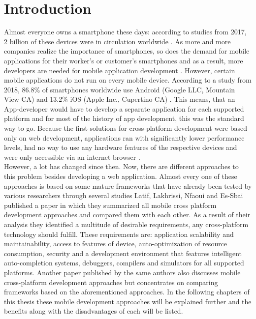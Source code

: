 \documentclass[Bachelor,BIF,english]{twbook}
\begin{document}
\chapter{Introduction}
Almost everyone owns a smartphone these days: according to studies from 2017, 2 billion of these devices were in circulation worldwide \cite[p.~184]{MartinezLecomte2017}. As more and more companies realize the importance of smartphones, so does the demand for mobile applications for their worker's or customer’s smartphones and as a result, more developers are needed for mobile application development \cite{Danielsson_2016} \cite{GaouarBenamarBendimerad2016}.
However, certain mobile applications do not run on every mobile device. According to a study \cite{OSMarketShare} from 2018, 86.8\% of smartphones worldwide use Android (Google LLC, Mountain View CA) and 13.2\% iOS (Apple Inc., Cupertino CA) \cite[p.~5]{Steczko2016}. This means, that an App-developer  would have to develop a separate application for each supported platform and for most of the history of app development, this was the standard way to go. Because the first solutions for cross-platform development were based only on web development, applications ran with significantly lower performance levels, had no way to use any hardware features of the respective devices and were only accessible via an internet browser \cite[p.~626]{6420693} \cite[p.~1]{7934674}.
\\[\baselineskip]
However, a lot has changed since then. Now, there are different approaches to this problem besides developing a web application. Almost every one of these approaches is based on some mature frameworks that have already been tested by various researchers through several studies Latif, Lakhrissi, Nfaoui and Es-Sbai published a paper \cite{7479278} in which they summarized all mobile cross platform development approaches and compared them with each other. As a result of their analysis they identified a multitude of desirable requirements, any cross-platform technology should fulfill. These requirements are: application scalability and maintainability, access to features of device, auto-optimization of resource consumption, security and a development environment that features intelligent auto-completion systems, debuggers, compilers and simulators for all supported platforms. Another paper \cite{7934674} published by the same authors also discusses mobile cross-platform development approaches but concentrates on comparing frameworks based on the aforementioned approaches. In the following chapters of this thesis these mobile development approaches will be explained further and the benefits along with the disadvantages of each will be listed.
\end{document}
